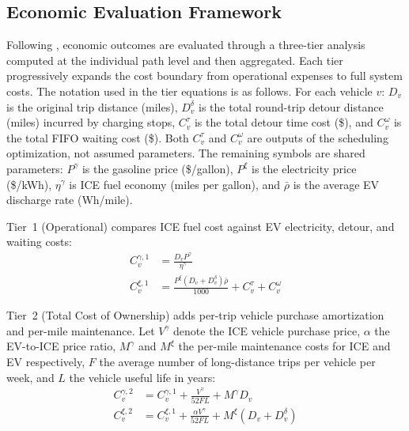 \subsection{Economic Evaluation Framework}\label{sec:economic_framework}

Following \citet{cokyasar2026electrification}, economic outcomes are evaluated through a three-tier analysis computed at the individual path level and then aggregated. Each tier progressively expands the cost boundary from operational expenses to full system costs. The notation used in the tier equations is as follows. For each vehicle $v$: $D_v$ is the original trip distance (miles), $D_v^{\delta}$ is the total round-trip detour distance (miles) incurred by charging stops, $C_v^{\tau}$ is the total detour time cost (\$), and $C_v^{\omega}$ is the total FIFO waiting cost (\$). Both $C_v^{\tau}$ and $C_v^{\omega}$ are outputs of the scheduling optimization, not assumed parameters. The remaining symbols are shared parameters: $P^{\gamma}$ is the gasoline price (\$/gallon), $P^{\xi}$ is the electricity price (\$/kWh), $\eta^{\gamma}$ is ICE fuel economy (miles per gallon), and $\bar{\rho}$ is the average EV discharge rate (Wh/mile).

Tier~1 (Operational) compares ICE fuel cost against EV electricity, detour, and waiting costs:
\begin{align}
    C_{v}^{\gamma,1} &= \frac{D_v P^{\gamma} }{\eta^{\gamma}} \label{eq:t1ice} \\
    C_{v}^{\xi,1} &= \frac{P^{\xi}(D_v + D_v^{\delta}) \bar{\rho}}{1000} + C_v^{\tau} + C_v^{\omega} \label{eq:t1ev}
\end{align}

Tier~2 (Total Cost of Ownership) adds per-trip vehicle purchase amortization and per-mile maintenance. Let $V^{\gamma}$ denote the ICE vehicle purchase price, $\alpha$ the EV-to-ICE price ratio, $M^{\gamma}$ and $M^{\xi}$ the per-mile maintenance costs for ICE and EV respectively, $F$ the average number of long-distance trips per vehicle per week, and $L$ the vehicle useful life in years:
\begin{align}
    C_{v}^{\gamma,2} &= C_{v}^{\gamma,1} + \frac{V^{\gamma}}{ 52 FL} + M^{\gamma} D_v \label{eq:t2ice} \\
    C_{v}^{\xi,2} &= C_{v}^{\xi,1} + \frac{\alpha V^{\gamma}}{ 52 FL} + M^{\xi} (D_v + D_v^{\delta}) \label{eq:t2ev}
\end{align}

